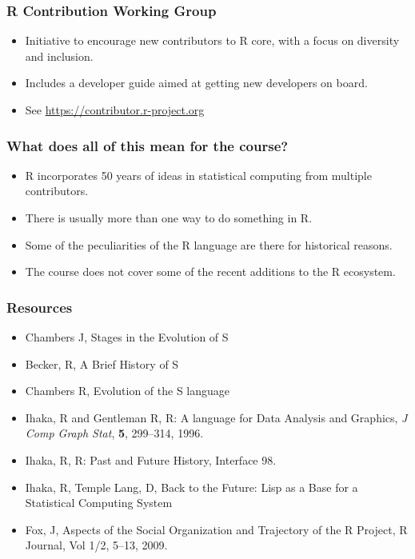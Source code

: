 \documentclass[svgnames, aspectratio=169]{beamer}
\begin{document}
\begin{frame}
  \frametitle{R Contribution Working Group}

  \begin{itemize}
  \item  Initiative to encourage new contributors to R core, with a focus on diversity and inclusion.
  \item  Includes a developer guide aimed at getting new developers on board.
  \item  See \url{https://contributor.r-project.org}
  \end{itemize}
  
\end{frame}
  
\begin{frame}
  \frametitle{What does all of this mean for the course?}

  \begin{itemize}
  \item R incorporates 50 years of ideas in statistical computing
    from multiple contributors.
  \item There is usually more than one way to do something in R.
  \item Some of the peculiarities of the R language are there for
    historical reasons.
  \item The course does not cover some of the recent additions to the
    R ecosystem.
  \end{itemize}

\end{frame}
    
\begin{frame}
  \frametitle{Resources}

  \begin{itemize}
  \item Chambers J, Stages in the Evolution of S
  \item Becker, R, A Brief History of S
  \item Chambers R, Evolution of the S language
  \item Ihaka, R and Gentleman R, R: A language for Data Analysis and Graphics,
    {\em J Comp Graph Stat}, {\bf 5}, 299--314, 1996.
  \item Ihaka, R, R: Past and Future History, Interface 98.
  \item Ihaka, R, Temple Lang, D, Back to the Future: Lisp as a Base for a
    Statistical Computing System
  \item Fox, J, Aspects of the Social Organization and Trajectory of
    the R Project, R Journal, Vol 1/2, 5--13, 2009.
  \end{itemize}

\end{frame}
\end{document}
